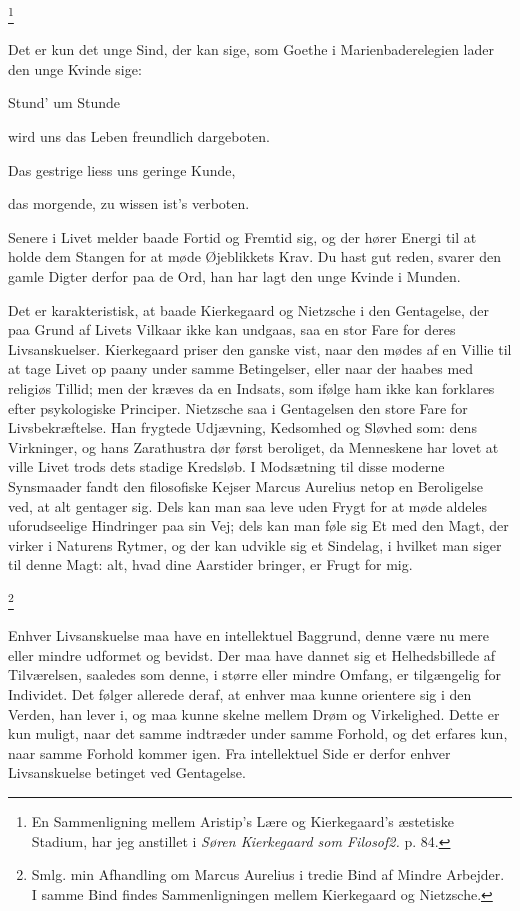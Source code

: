 \documentclass[12pt]{article}
\newcommand{\apage}[1]{\marginnote{\footnotesize\textit{[#1]}}}
\begin{document}
         \footnote{En Sammenligning mellem Aristip's Lære og Kierkegaard's
\guillemotright{}æstetiske Stadium\guillemotleft{}, har jeg anstillet i
\textit{Søren Kierkegaard som Filosof2.} p. 84.}

       Det er kun det unge Sind, der kan sige, som Goethe i Marienbaderelegien
lader den unge Kvinde sige:

Stund' um Stunde

wird uns das Leben freundlich dargeboten.

Das gestrige liess uns geringe Kunde,

das morgende, zu wissen ist's verboten.

Senere i Livet melder baade Fortid og Fremtid sig, og der hører Energi til at
holde dem Stangen for at møde Øjeblikkets Krav. \guillemotright{}Du hast gut
reden\guillemotleft{}, svarer den gamle Digter derfor paa de Ord, han har lagt
den unge Kvinde i Munden.

Det er karakteristisk, at baade Kierkegaard og Nietzsche i den Gentagelse, der
paa Grund af Livets Vilkaar
\setcounter{footnote}{0}%
\apage{66}ikke kan undgaas, saa en stor Fare for deres Livsanskuelser.
Kierkegaard priser den ganske vist, naar den mødes af en Villie til at tage
Livet op paany under samme Betingelser, eller naar der haabes med religiøs
Tillid; men der kræves da en Indsats, som ifølge ham ikke kan forklares efter
psykologiske Principer. Nietzsche saa i Gentagelsen den store Fare for
Livsbekræftelse. Han frygtede Udjævning, Kedsomhed og Sløvhed som: dens
Virkninger, og hans Zarathustra dør først beroliget, da Menneskene har lovet at
ville Livet trods dets stadige Kredsløb. I Modsætning til disse moderne
Synsmaader fandt den filosofiske Kejser Marcus Aurelius netop en Beroligelse
ved, at alt gentager sig. Dels kan man saa leve uden Frygt for at møde aldeles
uforudseelige Hindringer paa sin Vej; dels kan man føle sig Et med den Magt,
der virker i Naturens Rytmer, og der kan udvikle sig et Sindelag, i hvilket man
siger til denne Magt: alt, hvad dine Aarstider bringer, er Frugt for mig.

         \footnote{Smlg. min Afhandling om Marcus Aurelius i tredie Bind af
\guillemotright{}Mindre Arbejder\guillemotleft{}. I samme Bind findes
Sammenligningen mellem Kierkegaard og Nietzsche.}

Enhver Livsanskuelse maa have en intellektuel Baggrund, denne være nu mere
eller mindre udformet og bevidst. Der maa have dannet sig et Helhedsbillede af
Tilværelsen, saaledes som denne, i større eller mindre Omfang, er tilgængelig
for Individet. Det følger allerede deraf, at enhver maa kunne orientere sig i
den Verden, han lever i, og maa kunne skelne mellem Drøm og Virkelighed. Dette
er kun muligt, naar det samme indtræder under samme Forhold, og det erfares
kun, naar samme Forhold kommer igen. Fra intellektuel Side er derfor enhver
Livsanskuelse betinget ved Gentagelse.
\end{document}
